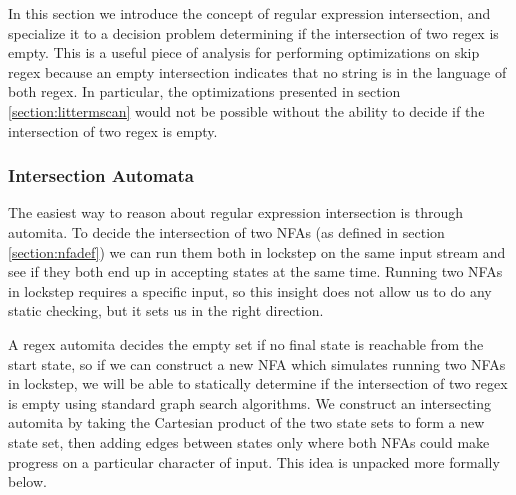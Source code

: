 In this section we introduce the concept of regular expression
intersection, and specialize it to a decision problem determining
if the intersection of two regex is empty. This is a useful
piece of analysis for performing optimizations on skip regex
because an empty intersection indicates that no string is in
the language of both regex. In particular, the optimizations
presented in section \ref{section:littermscan} would not be
possible without the ability to decide if the intersection
of two regex is empty.

\subsubsection{Intersection Automata}

The easiest way to reason about regular expression intersection
is through automita. To decide the intersection of two NFAs
(as defined in section \ref{section:nfadef}) we
can run them both in lockstep on the same input stream
and see if they both end up in accepting states at the same time.
Running two NFAs in lockstep requires a specific input, so this insight
does not allow us to do any static checking, but it sets us in the
right direction.

A regex automita decides the empty set if no final state is reachable
from the start state, so if we can construct a new NFA which simulates
running two NFAs in lockstep, we will be able to statically determine
if the intersection of two regex is empty using standard graph
search algorithms. We construct an
intersecting automita by taking the Cartesian product
of the two state sets to form a new state set, then adding edges
between states only where both NFAs could make progress on a particular
character of input. This idea is unpacked more formally below.

